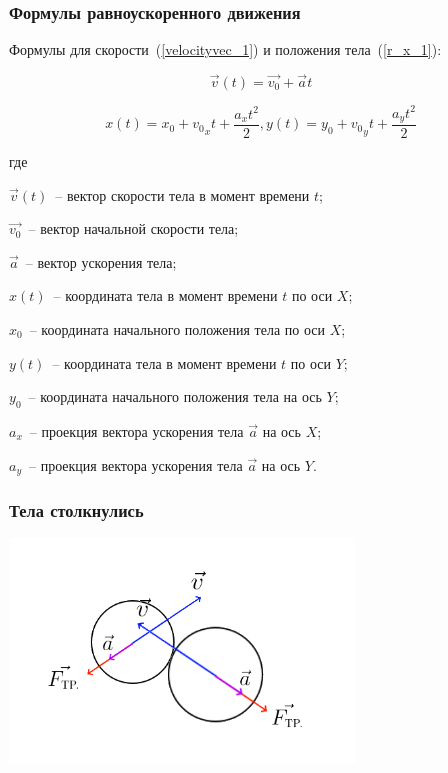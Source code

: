 \documentclass[xetex,aspectratio=43]{beamer}
\newenvironment{Underequation}{
    \small
    \noindent
    где
    \hspace{-1.45ex}
    \setlength{\parindent}{3.5ex}
}{}
\begin{document}
\begin{frame}
    \frametitle{Формулы равноускоренного движения}
    Формулы для скорости~(\ref{velocityvec_1}) и положения тела~(\ref{r_x_1}):

    \begin{equation}\label{velocityvec_1}
        \vec{v}(t) = \vec{v_0} + \vec{a}t
    \end{equation}

    \begin{equation}\label{r_x_1}
        x(t) = x_0 + {v_0}_x t + \frac{a_x t^2}{2},
        y(t) = y_0 + {v_0}_y t + \frac{a_y t^2}{2}
    \end{equation}


    \begin{Underequation}
        \(\vec{v}(t)\)~-- вектор скорости тела в момент времени \(t\);

        \(\vec{v_0}\)~-- вектор начальной скорости тела;

        \(\vec{a}\)~-- вектор ускорения тела;

        \(x(t)\)~-- координата тела в момент времени \(t\) по оси \(X\);

        \(x_0\)~-- координата начального положения тела по оси \(X\);

        \(y(t)\)~-- координата тела в момент времени \(t\) по оси \(Y\);

        \(y_0\)~-- координата начального положения тела на ось \(Y\);

        \(a_x\)~-- проекция вектора ускорения тела \(\vec{a}\) на ось \(X\);

        \(a_y\)~-- проекция вектора ускорения тела \(\vec{a}\) на ось \(Y\).
    \end{Underequation}
\end{frame}

\begin{frame}
    \frametitle{Тела столкнулись}

    \includegraphics[height=6cm]{body_collision}

\end{frame}
\end{document}
